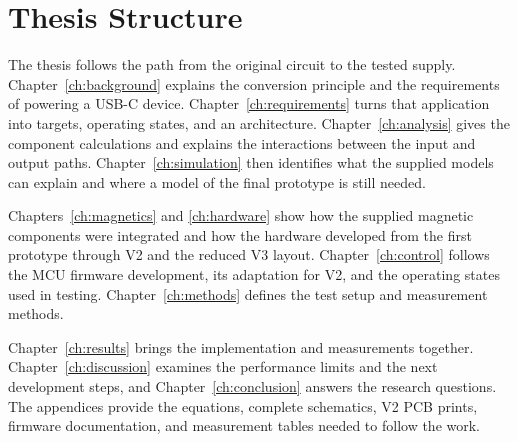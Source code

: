 \section{Thesis Structure}
\label{sec:intro-structure}

The thesis follows the path from the original circuit to the tested supply. Chapter~\ref{ch:background} explains the conversion principle and the requirements of powering a USB-C device. Chapter~\ref{ch:requirements} turns that application into targets, operating states, and an architecture. Chapter~\ref{ch:analysis} gives the component calculations and explains the interactions between the input and output paths. Chapter~\ref{ch:simulation} then identifies what the supplied models can explain and where a model of the final prototype is still needed.

Chapters~\ref{ch:magnetics} and \ref{ch:hardware} show how the supplied magnetic components were integrated and how the hardware developed from the first prototype through V2 and the reduced V3 layout. Chapter~\ref{ch:control} follows the MCU firmware development, its adaptation for V2, and the operating states used in testing. Chapter~\ref{ch:methods} defines the test setup and measurement methods.

Chapter~\ref{ch:results} brings the implementation and measurements together. Chapter~\ref{ch:discussion} examines the performance limits and the next development steps, and Chapter~\ref{ch:conclusion} answers the research questions. The appendices provide the equations, complete schematics, V2 PCB prints, firmware documentation, and measurement tables needed to follow the work.